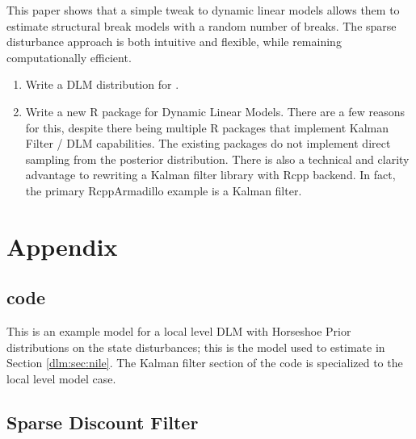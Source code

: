 This paper shows that a simple tweak to dynamic linear models allows them to estimate structural break models with a random number of breaks.
The sparse disturbance approach is both intuitive and flexible, while remaining computationally efficient.

\begin{enumerate}
\item Write a DLM distribution for \Stan{}.
\item Write a new R package for Dynamic Linear Models. There are a few reasons for this, despite there being multiple R packages that implement Kalman Filter / DLM capabilities. 
The existing packages do not implement direct sampling from the posterior distribution. 
There is also a technical and clarity advantage to rewriting a Kalman filter library with Rcpp backend. In fact, the primary RcppArmadillo example is 
a Kalman filter.
\end{enumerate}

\clearpage{}

\section{Appendix}
\label{sec:appendix
}
\subsection{code}
\label{dlm:sec:code}

This is an example \Stan{} model for a local level DLM with Horseshoe Prior distributions on the state disturbances; this is the \Stan{} model used to estimate  in Section \ref{dlm:sec:nile}. 
The Kalman filter section of the \Stan{} code is specialized to the local level model case.

\begin{singlespace}
%    
\end{singlespace}

\subsection{Sparse Discount Filter}
\label{dlm:sec:sparse-disc-filt}

